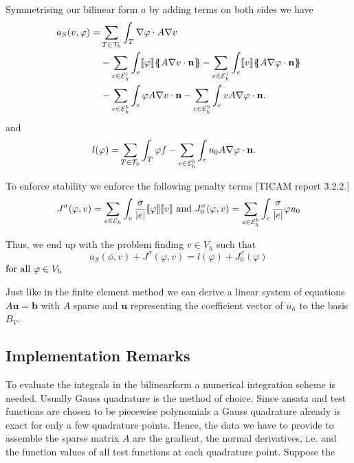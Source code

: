 Symmetrising our bilinear form $a$ by adding terms on both sides we have
\begin{align}
 a_S(v, \varphi) = &\sum\limits_{T \in \triang} \int_T \nabla \varphi \cdot A \nabla v \nonumber \\
  &-\sum\limits_{e \in \edgesi}\int_{e} \jump \varphi \average{A \nabla v \cdot \mathbf n } 
 - \sum\limits_{e \in \edgesi}\int_{e} \jump v \average{ A \nabla \varphi \cdot \mathbf n } \nonumber\\ 
 & - \sum\limits_{e \in \edgesb}\int_{e} \varphi A \nabla v \cdot \mathbf n 
    - \sum\limits_{e \in \edgesb}\int_{e} v A \nabla \varphi \cdot \mathbf n.
\end{align}
and 
\begin{align}
	l(\varphi) =& \sum\limits_{T \in \mathcal{T}_h} \int_T \varphi f -\sum\limits_{e \in \mathcal{E}_h^b}\int_{e} u_0 A \nabla \varphi \cdot \mathbf n.
\end{align} 


To enforce stability we enforce the following penalty terms [TICAM report 3.2.2.]
\begin{align}
	J^\sigma(\varphi, v) = \sum\limits_{e \in \mathcal{E}_h} \int_e \frac \sigma {|e|} \llbracket \varphi \rrbracket \llbracket v \rrbracket \textnormal{ and } 	J^\sigma_0(\varphi, v) = \sum\limits_{e \in \mathcal{E}_h^b} \int_e \frac \sigma {|e|} \varphi u_0  
\end{align}

Thus, we end up with the problem finding $v \in V_h$ such that
\[
	a_S(\phi,v) + J^\sigma(\varphi,v) = l(\varphi) + J^\sigma_0(\varphi)
\] 
$  \textnormal{for all } \varphi \in V_h$\

Just like in the finite element method we can derive a linear system of equations $A \mathbf{u} = \mathbf{b}$ with $A$ sparse and $\mathbf{u}$ representing the coefficient vector of $u_h$ to the basis $B_V$.  

\subsection{Implementation Remarks}
To evaluate the integrals in the bilinearform a numerical integration scheme is needed. Usually Gauss quadrature is the method of choice. Since ansatz and test functions are chosen to be piecewise polynomials a Gauss quadrature already is exact for only a few quadrature points.
Hence, the data we have to provide to assemble the sparse matrix $A$ are the gradient, the normal derivatives, i.e. and the function values of all test functions at each quadrature point.
Suppose the 


